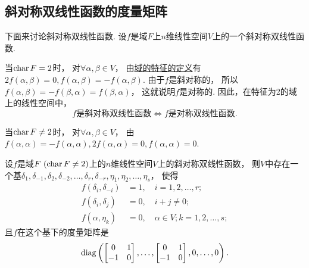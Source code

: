 \subsection{斜对称双线性函数的度量矩阵}
下面来讨论斜对称双线性函数.
设\(f\)是域\(F\)上\(n\)维线性空间\(V\)上的一个斜对称双线性函数.

当\(\operatorname{char} F=2\)时，
对\(\forall \alpha,\beta \in V\)，
由\hyperref[definition:域的特征.域的特征]{域的特征的定义}有\(2 f(\alpha,\beta) = 0,
f(\alpha,\beta) = -f(\alpha,\beta)\).
由于\(f\)是斜对称的，
所以\(f(\alpha,\beta)
= -f(\beta,\alpha)
= f(\beta,\alpha)\)，
这就说明\(f\)是对称的.
因此，在特征为2的域上的线性空间中，\begin{equation*}
	\text{$f$是斜对称双线性函数}
	\iff
	\text{$f$是对称双线性函数}.
\end{equation*}

当\(\operatorname{char} F\neq2\)时，
对\(\forall \alpha,\beta \in V\)，
由\(f(\alpha,\alpha) = -f(\alpha,\alpha),
2 f(\alpha,\alpha) = 0,
f(\alpha,\alpha) = 0\).

\begin{theorem}\label{theorem:双线性函数.特征不为2的域上的斜对称双线性函数在某个基下的度量矩阵是分块对角矩阵}
\def\MatrixChunk{\begin{bmatrix}
	0 & 1 \\
	-1 & 0
\end{bmatrix}}
设\(f\)是域\(F\ (\operatorname{char} F\neq2)\)上的\(n\)维线性空间\(V\)上的斜对称双线性函数，
则\(V\)中存在一个基\(\delta_1,\delta_{-1},\delta_2,\delta_{-2},\dotsc,\delta_r,\delta_{-r},\eta_1,\eta_2,\dotsc,\eta_s\)，
使得\begin{align*}
	f(\delta_i,\delta_{-i}) &= 1,
	\quad i=1,2,\dotsc,r; \\
	f(\delta_i,\delta_j) &= 0,
	\quad i+j\neq0; \\
	f(\alpha,\eta_k) &= 0,
	\quad \alpha \in V; k=1,2,\dotsc,s;
\end{align*}
且\(f\)在这个基下的度量矩阵是\begin{equation*}
	\diag\left(
		\MatrixChunk,
		\dotsc,
		\MatrixChunk,
		0,
		\dotsc,
		0
	\right).
\end{equation*}
\end{theorem}

